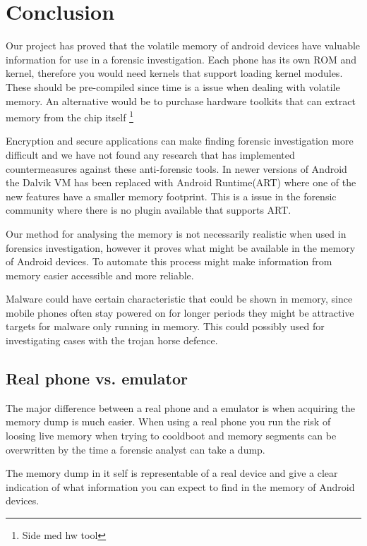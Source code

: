 \section{Conclusion}
Our project has proved that the volatile memory of android devices have valuable information for use 
in a forensic investigation. %
Each phone has its own ROM and kernel, therefore you would need kernels that support loading kernel 
modules. These should be pre-compiled since time is a issue when dealing with volatile memory. An 
alternative would be to purchase hardware toolkits that can extract memory from the chip itself 
\footnote{Side med hw tool} %

Encryption and secure applications can make finding forensic investigation more difficult and we have not found 
any research that has implemented countermeasures against these anti-forensic tools. In newer versions 
of Android the Dalvik VM has been replaced with Android Runtime(ART) where one of the new 
features have a smaller memory footprint. This is a issue in the forensic community where there is no 
plugin available that supports ART.

Our method for analysing the memory is not necessarily realistic when used in forensics investigation, 
however it proves what might be available in the memory of Android devices. 
To automate this process might make information from memory easier accessible and more reliable.

Malware could have certain characteristic that could be shown in memory, since mobile phones often stay 
powered on for longer periods they might be attractive targets for malware only running in memory. 
This could possibly used for investigating cases with the trojan horse defence.

\subsection{Real phone vs. emulator}
The major difference between a real phone and a emulator is when acquiring the memory dump is much 
easier. When using a real phone you run the risk of loosing live memory when trying to cooldboot and 
memory segments can be overwritten by the time a forensic analyst can take a dump.

The memory dump in it self is representable of a real device and give a clear indication of what 
information you can expect to find in the memory of Android devices.




